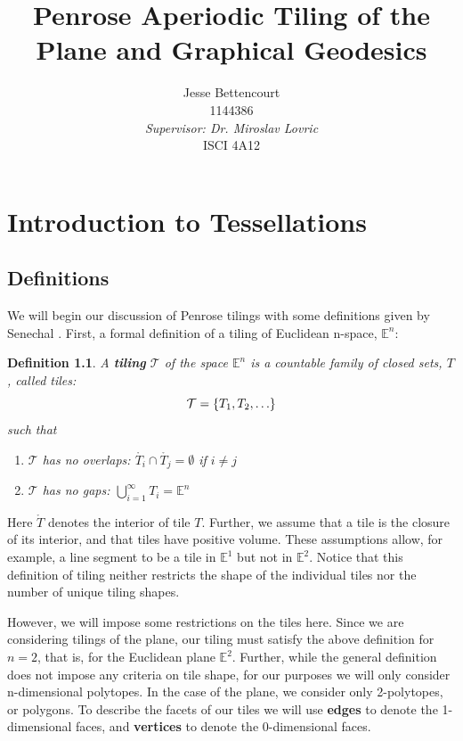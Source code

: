 \documentclass[
  oneside,
  11pt, a4paper,
  footinclude=true,
  headinclude=true,
  cleardoublepage=empty
]{scrbook}
\title{Penrose Aperiodic Tiling of the Plane and Graphical Geodesics}
\author{Jesse Bettencourt\\1144386\\[80pt]  \textit{Supervisor: Dr. Miroslav Lovric}\\[30pt]ISCI 4A12}
\newtheorem{mydef}{Definition}
\begin{document}
\maketitle









\chapter{Introduction to Tessellations}
\section{Definitions} %
We will begin our discussion of Penrose tilings with some definitions given by Senechal \cite{Senechal1996}. First, a formal definition of a tiling of Euclidean n-space, $\mathbb{E}^n$:



\begin{mydef}
A \textbf{tiling} $\mathcal{T}$ of the space $\mathbb{E}^n$ is a countable family of closed sets, $T$, called tiles:
\begin{equation*}
\mathcal{T}=\{T_1,T_2,\mathellipsis\}
\end{equation*}
such that
\begin{enumerate}
\item $\mathcal{T}$ has no overlaps: $\mathring{T_i} \cap \mathring{T_j}=\emptyset$ if $i\neq j$
\item $\mathcal{T}$ has no gaps: $\bigcup_{i=1}^\infty T_i = \mathbb{E}^n$
\end{enumerate}
\end{mydef}


Here $\mathring{T}$ denotes the interior of tile $T$. Further, we assume that a tile is the closure of its interior, and that tiles have positive volume. These assumptions allow, for example, a line segment to be a tile in $\mathbb{E}^1$ but not in $\mathbb{E}^2$. Notice that this definition of tiling neither restricts the shape of the individual tiles nor the number of unique tiling shapes.  

However, we will impose some restrictions on the tiles here. Since we are considering tilings of the plane, our tiling must satisfy the above definition for $n=2$, that is, for the Euclidean plane $\mathbb{E}^2$. Further, while the general definition does not impose any criteria on tile shape, for our purposes we will only consider n-dimensional polytopes. In the case of the plane, we consider only 2-polytopes, or polygons. To describe the facets of our tiles we will use \textbf{edges} to denote the 1-dimensional faces, and \textbf{vertices} to denote the 0-dimensional faces. 
\end{document}
